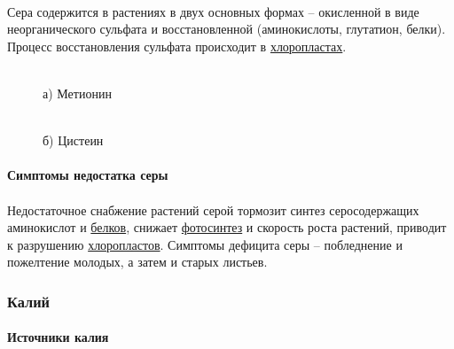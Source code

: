 \paragraph*{}Сера содержится в растениях в двух основных формах -- окисленной в виде неорганического сульфата и восстановленной (аминокислоты, глутатион, белки). Процесс восстановления сульфата происходит в \hyperlink{plastides}{хлоропластах}.


\begin{figure}[h]
\begin{minipage}[h]{0.49\linewidth}
 \\ а) Метионин
\end{minipage}
\hfill
\begin{minipage}[h]{0.49\linewidth}
 \\ б) Цистеин
\end{minipage}
\label{saminoacids}
\end{figure}


\paragraph*{Симптомы недостатка серы}

\paragraph*{}Недостаточное снабжение растений серой тормозит синтез серосодержащих аминокислот и \hyperlink{proteins}{белков}, снижает \hyperlink{photosyntesis}{фотосинтез} и скорость роста растений, приводит к разрушению \hyperlink{plastides}{хлоропластов}. Симптомы дефицита серы -- побледнение и пожелтение молодых, а затем и старых листьев.

\subsubsection*{Калий}

\paragraph*{Источники калия}

